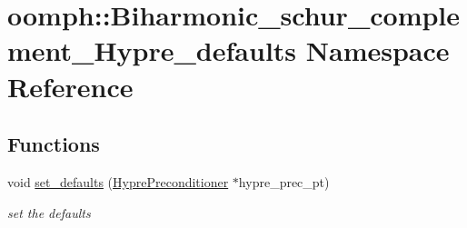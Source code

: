 \hypertarget{namespaceoomph_1_1Biharmonic__schur__complement__Hypre__defaults}{}\section{oomph\+:\+:Biharmonic\+\_\+schur\+\_\+complement\+\_\+\+Hypre\+\_\+defaults Namespace Reference}
\label{namespaceoomph_1_1Biharmonic__schur__complement__Hypre__defaults}
\subsection*{Functions}
\begin{DoxyCompactItemize}
\item 
void \hyperlink{namespaceoomph_1_1Biharmonic__schur__complement__Hypre__defaults_acff454a359087ff5bcdc63521c9e6228}{set\+\_\+defaults} (\hyperlink{classoomph_1_1HyprePreconditioner}{Hypre\+Preconditioner} $\ast$hypre\+\_\+prec\+\_\+pt)
\begin{DoxyCompactList}\small\item\em set the defaults \end{DoxyCompactList}\end{DoxyCompactItemize}
